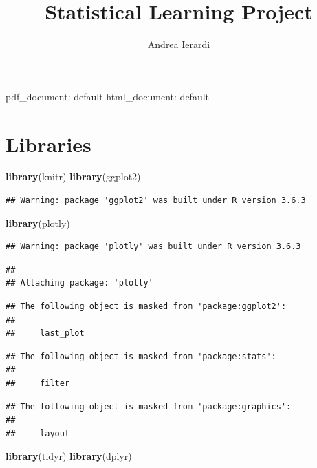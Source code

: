 \documentclass[
]{article}
\title{Statistical Learning Project}
\author{Andrea Ierardi}
\date{}
\newenvironment{Shaded}{\begin{snugshade}}{\end{snugshade}}
\newcommand{\KeywordTok}[1]{\textcolor[rgb]{0.13,0.29,0.53}{\textbf{#1}}}
\newcommand{\NormalTok}[1]{#1}
\begin{document}
\maketitle

pdf\_document: default html\_document: default

\hypertarget{libraries}{%
\section{Libraries}\label{libraries}}

\begin{Shaded}
\begin{Highlighting}[]
\KeywordTok{library}\NormalTok{(knitr)}
\KeywordTok{library}\NormalTok{(ggplot2)}
\end{Highlighting}
\end{Shaded}

\begin{verbatim}
## Warning: package 'ggplot2' was built under R version 3.6.3
\end{verbatim}

\begin{Shaded}
\begin{Highlighting}[]
\KeywordTok{library}\NormalTok{(plotly)}
\end{Highlighting}
\end{Shaded}

\begin{verbatim}
## Warning: package 'plotly' was built under R version 3.6.3
\end{verbatim}

\begin{verbatim}
## 
## Attaching package: 'plotly'
\end{verbatim}

\begin{verbatim}
## The following object is masked from 'package:ggplot2':
## 
##     last_plot
\end{verbatim}

\begin{verbatim}
## The following object is masked from 'package:stats':
## 
##     filter
\end{verbatim}

\begin{verbatim}
## The following object is masked from 'package:graphics':
## 
##     layout
\end{verbatim}

\begin{Shaded}
\begin{Highlighting}[]
\KeywordTok{library}\NormalTok{(tidyr)}
\KeywordTok{library}\NormalTok{(dplyr)}
\end{Highlighting}
\end{Shaded}
\end{document}
